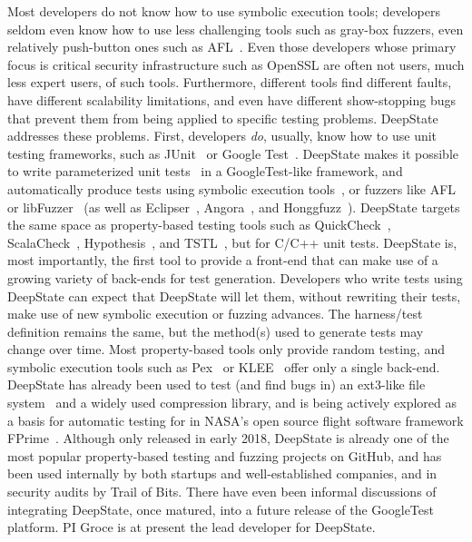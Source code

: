 Most developers do not know how to use symbolic execution tools; developers seldom even know how to use less challenging tools such as gray-box fuzzers, even relatively push-button ones such as AFL~\cite{aflfuzz}.  Even those developers whose primary focus is critical security infrastructure such as OpenSSL are often not users, much less expert users, of such tools.  Furthermore, different tools find different faults, have different scalability limitations, and even have different show-stopping bugs that prevent them from being applied to specific testing problems.  DeepState~\cite{DeepState,DeepStateTutorial} addresses these problems.  First, developers \emph{do}, usually, know how to use unit testing frameworks, such as JUnit~\cite{JUnit} or Google Test~\cite{GoogleTest}. DeepState makes it possible to write parameterized unit tests~\cite{ParamUnit} in a GoogleTest-like framework, and automatically produce tests using symbolic execution tools~\cite{angr1,angr2,angr3,Manticore}, or fuzzers like AFL~\cite{aflfuzz} or libFuzzer~\cite{libFuzzer} (as well as Eclipser~\cite{eclipser}, Angora~\cite{angora}, and Honggfuzz~\cite{Honggfuzz}).  DeepState targets the same space as property-based testing tools such as QuickCheck~\cite{ClaessenH00}, ScalaCheck~\cite{ScalaCheckDoc}, Hypothesis~\cite{Hypothesis}, and TSTL~\cite{NFM15,tstlsttt}, but for C/C++ unit tests. DeepState is, most importantly, the first tool to provide a front-end that can make use of a growing variety of back-ends for test generation.  Developers who write tests using DeepState can expect that DeepState will let them, without rewriting their tests, make use of new symbolic execution or fuzzing advances.  The harness/test definition remains the same, but the method(s) used to generate tests may change over time.  Most property-based tools only provide random testing, and symbolic execution tools such as Pex~\cite{Pex,UnitMeister} or KLEE~\cite{KLEE} offer only a single back-end.
DeepState has already been used to test (and find bugs in) an ext3-like file system~\cite{testfs,testfsrepo} and a widely used compression library, and is being actively explored as a basis for automatic testing for in NASA's open source flight software framework FPrime~\cite{fprime,fprimerepo}.  Although only released in early 2018, DeepState is already one of the most popular property-based testing and fuzzing projects on GitHub, and has been used internally by both startups and well-established companies, and in security audits by Trail of Bits.  There have even been informal discussions of integrating DeepState, once matured, into a future release of the GoogleTest~\cite{GoogleTest} platform.  PI Groce is at present the lead developer for DeepState.